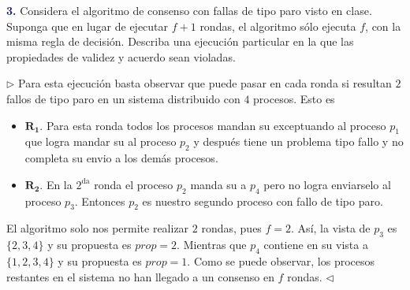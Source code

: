 \textbf{\textcolor{MidnightBlue}{3.}} Considera el algoritmo de consenso con
fallas de tipo paro visto en clase. Suponga que en lugar de ejecutar $f + 1$
rondas, el algoritmo sólo ejecuta $f$, con la misma regla de decisión. Describa
una ejecución particular en la que las propiedades de validez y acuerdo sean violadas.
\newline

$\rhd$ Para esta ejecución basta observar que puede pasar en cada
ronda si resultan $2$ fallos de tipo paro en un sistema distribuido
con $4$ procesos. Esto es
\begin{itemize}
\item $\mathbf{R_1}.$ Para esta ronda todos los procesos mandan su 
      exceptuando al proceso $p_1$ que logra mandar su  al proceso
      $p_2$ y después tiene un problema tipo fallo y no completa su envio a
      los demás procesos.
\item $\mathbf{R_2.}$ En la $2^{\text{da}}$ ronda el proceso $p_2$ manda su
       a $p_4$ pero no logra enviarselo al proceso $p_3$. Entonces
      $p_2$ es nuestro segundo proceso con fallo de tipo paro.
\end{itemize}
El algoritmo solo nos permite realizar $2$ rondas, pues $f = 2$. Así,
la vista de $p_3$ es $\{2, 3, 4\}$ y su propuesta es $prop = 2$. Mientras
que $p_4$ contiene en su vista a $\{1, 2, 3, 4\}$ y su propuesta es
$prop = 1$. Como se puede observar, los procesos restantes en el sistema
no han llegado a un consenso en $f$ rondas.
\hfill $\lhd$
